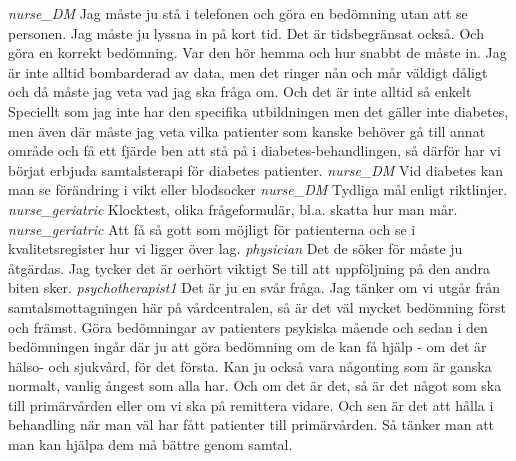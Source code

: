 \documentclass[12pt,a4paper,oneside]{article}
\begin{document}
 {\it nurse\_DM %
} 
Jag måste ju stå i telefonen och göra en bedömning utan att se personen. Jag måste ju lyssna in på kort tid. Det är tidsbegränsat också. Och göra en korrekt bedömning. Var den hör hemma och hur snabbt de måste in. Jag är inte alltid bombarderad av data, men det ringer nån och mår väldigt dåligt och då måste jag veta vad jag ska fråga om. Och det är inte alltid så enkelt Speciellt som jag inte har den specifika utbildningen men det gäller inte diabetes, men även där måste jag veta vilka patienter som kanske behöver gå till annat område och få ett fjärde ben att stå på i diabetes-behandlingen, så därför har vi börjat erbjuda samtalsterapi för diabetes patienter. %
 {\it nurse\_DM %
} 
Vid diabetes kan man se förändring i vikt eller blodsocker %
 {\it nurse\_DM %
} 
Tydliga mål enligt riktlinjer. %
 {\it nurse\_geriatric %
} 
Klocktest, olika frågeformulär, bl.a. skatta hur man mår. %
 {\it nurse\_geriatric %
} 
Att få så gott som möjligt för patienterna och se i kvalitetsregister hur vi ligger över lag. %
 {\it physician %
} 
Det de söker för måste ju åtgärdas. Jag tycker det är oerhört viktigt Se till att uppföljning på den andra biten sker.  %
 {\it psychotherapist1 %
} 
Det är ju en svår fråga. Jag tänker om vi utgår från samtalsmottagningen här på vårdcentralen, så är det väl mycket bedömning först och främst. Göra bedömningar av patienters psykiska mående och sedan i den bedömningen ingår där ju att göra bedömning om de kan få hjälp - om det är hälso- och sjukvård, för det första. Kan ju också vara någonting som är ganska normalt, vanlig ångest som alla har. Och om det är det, så är det något som ska till primärvården eller om vi ska på remittera vidare. Och sen är det att hålla i behandling när man väl har fått patienter till primärvården. Så tänker man att man kan hjälpa dem må bättre genom samtal. %
\end{document}
